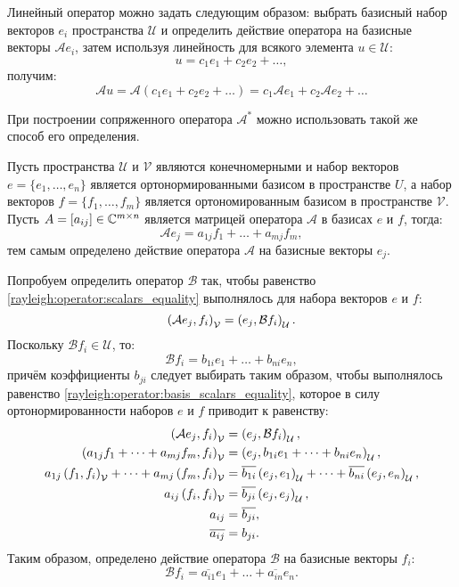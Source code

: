 Линейный оператор можно задать следующим образом: выбрать базисный набор векторов $e_i$ пространства $\mathcal{U}$ и определить действие оператора на базисные векторы
$\mathcal{A} e_i$, затем используя линейность для всякого элемента $u \in \mathcal{U}$:
\[
    u = c_1 e_1 + c_2 e_2 + \dots,
\]
получим:
\[
    \mathcal{A} u
    = \mathcal{A} ( c_1 e_1 + c_2 e_2 + \dots )
    = c_1 \mathcal{A} e_1 + c_2 \mathcal{A} e_2 + \dots
\]

При построении сопряженного оператора $\mathcal{A}^*$ можно использовать такой же способ его определения.

Пусть пространства $\mathcal{U}$ и $\mathcal{V}$ являются конечномерными и набор векторов $e = \{ e_1, \dots, e_n \}$ является ортонормированными базисом
в пространстве $U$, а набор векторов $f = \{f_1, \dots, f_m \}$ является ортономированным базисом в пространстве $\mathcal{V}$. Пусть
$A = [a_{ij}] \in \mathbb{C}^{m \times n}$ является матрицей оператора $\mathcal{A}$ в базисах $e$ и $f$, тогда:
\[
    \mathcal{A} e_j = a_{1j} f_1 + \dots + a_{mj} f_m,
\]
тем самым определено действие оператора $\mathcal{A}$ на базисные векторы $e_j$.

Попробуем определить оператор $\mathcal{B}$ так, чтобы равенство \eqref{rayleigh:operator:scalars_equality} выполнялось для набора векторов $e$ и $f$:
\begin{equation}
    \label{rayleigh:operator:basis_scalars_equality}
    \left ( \mathcal{A} e_j, f_i \right )_\mathcal{V} = \left ( e_j, \mathcal{B} f_i \right )_\mathcal{U} .
\end{equation}
Поскольку $\mathcal{B} f_i \in \mathcal{U}$, то:
\[
    \mathcal{B} f_i = b_{1i} e_1 + \dots + b_{ni} e_n ,
\]
причём коэффициенты $b_{ji}$ следует выбирать таким образом, чтобы выполнялось равенство \eqref{rayleigh:operator:basis_scalars_equality}, которое в силу
ортонормированности наборов $e$ и $f$ приводит к равенству:
\begin{align*}
    \left ( \mathcal{A} e_j, f_i \right )_\mathcal{V} & = \left ( e_j, \mathcal{B} f_i \right )_\mathcal{U} , \\
    \left ( a_{1j} f_1 + \dots + a_{mj} f_m, f_i \right )_\mathcal{V} & = \left ( e_j, b_{1i} e_1 + \dots + b_{ni} e_n \right )_\mathcal{U} , \\
    a_{1j} \left ( f_1, f_i \right )_\mathcal{V} + \dots + a_{mj} \left ( f_m, f_i \right )_\mathcal{V} & = \overline{b_{1i}} \left ( e_j, e_1 \right )_\mathcal{U} + \dots + \overline{b_{ni}} \left ( e_j, e_n \right )_\mathcal{U} , \\
    a_{ij} \left ( f_i, f_i \right )_\mathcal{V} & = \overline{b_{ji}} \left ( e_j, e_j \right )_\mathcal{U} , \\
    a_{ij} & = \overline{b_{ji}} , \\
    \overline{a_{ij}} & = b_{ji} .
\end{align*}
Таким образом, определено действие оператора $\mathcal{B}$ на базисные векторы $f_i$:
\begin{equation}
    \label{rayleigh:operator:basis_images}
    \mathcal{B} f_i = \overline{a_{i1}} e_1 + \dots + \overline{a_{in}} e_n .
\end{equation}

